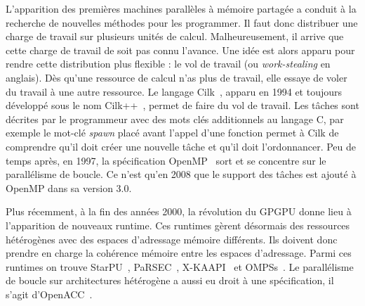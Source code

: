 L'apparition des premières machines parallèles à mémoire partagée a conduit à la recherche de nouvelles méthodes pour les programmer.
%
Il faut donc distribuer une charge de travail sur plusieurs unités de calcul.
%
Malheureusement, il arrive que cette charge de travail de soit pas connu l'avance.
%
Une idée est alors apparu pour rendre cette distribution plus flexible : le vol de travail (ou {\em work-stealing} en anglais).
%
Dès qu'une ressource de calcul n'as plus de travail, elle essaye de voler du travail à une autre ressource.
%
Le langage Cilk~\cite{Cilk}, apparu en 1994 et toujours développé sous le nom Cilk++~\cite{Cilk++}, permet de faire du vol de travail.
%
Les tâches sont décrites par le programmeur avec des mots clés additionnels au langage C, par exemple le mot-clé {\em spawn} placé avant l'appel d'une fonction permet à Cilk de comprendre qu'il doit créer une nouvelle tâche et qu'il doit l'ordonnancer.
%
Peu de temps après, en 1997, la spécification OpenMP~\cite{OpenMP} sort et se concentre sur le parallélisme de boucle.
%
Ce n'est qu'en 2008 que le support des tâches est ajouté à OpenMP dans sa version 3.0.


Plus récemment, à la fin des années 2000, la révolution du GPGPU donne lieu à l'apparition de nouveaux runtime.
%
Ces runtimes gèrent désormais des ressources hétérogènes avec des espaces d'adressage mémoire différents.
%
Ils doivent donc prendre en charge la cohérence mémoire entre les espaces d'adressage.
%
Parmi ces runtimes on trouve StarPU~\cite{starpu}, PaRSEC~\cite{PaRSEC}, X-KAAPI~\cite{xkaapi} et OMPSs~\cite{OMPSs}.
%
Le parallélisme de boucle sur architectures hétérogène a aussi eu droit à une spécification, il s'agit d'OpenACC~\cite{OpenACC}.
